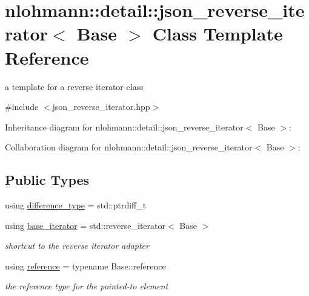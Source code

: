 \hypertarget{classnlohmann_1_1detail_1_1json__reverse__iterator}{}\section{nlohmann\+:\+:detail\+:\+:json\+\_\+reverse\+\_\+iterator$<$ Base $>$ Class Template Reference}
\label{classnlohmann_1_1detail_1_1json__reverse__iterator}


a template for a reverse iterator class  




{\ttfamily \#include $<$json\+\_\+reverse\+\_\+iterator.\+hpp$>$}



Inheritance diagram for nlohmann\+:\+:detail\+:\+:json\+\_\+reverse\+\_\+iterator$<$ Base $>$\+:


Collaboration diagram for nlohmann\+:\+:detail\+:\+:json\+\_\+reverse\+\_\+iterator$<$ Base $>$\+:
\subsection*{Public Types}
\begin{DoxyCompactItemize}
\item 
using \hyperlink{classnlohmann_1_1detail_1_1json__reverse__iterator_a9ab55987c05ec6427ad36082e351cc45}{difference\+\_\+type} = std\+::ptrdiff\+\_\+t
\item 
using \hyperlink{classnlohmann_1_1detail_1_1json__reverse__iterator_a6b2ef1d632fe49bfcc22fbd1abd62395}{base\+\_\+iterator} = std\+::reverse\+\_\+iterator$<$ Base $>$
\begin{DoxyCompactList}\small\item\em shortcut to the reverse iterator adapter \end{DoxyCompactList}\item 
using \hyperlink{classnlohmann_1_1detail_1_1json__reverse__iterator_a42f51a69bac7b2aebb613b2164e457f1}{reference} = typename Base\+::reference
\begin{DoxyCompactList}\small\item\em the reference type for the pointed-\/to element \end{DoxyCompactList}\end{DoxyCompactItemize}
